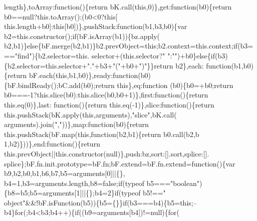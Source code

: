 \begin{DoxyCode}
      length\},toArray:\textcolor{keyword}{function}()\{\textcolor{keywordflow}{return} bK.call(\textcolor{keyword}{this},0)\},\textcolor{keyword}{get}:\textcolor{keyword}{function}(b0)\{\textcolor{keywordflow}{return} b0==null?this.toArray():(b0<0?this[
      this.length+b0]:this[b0])\},pushStack:function(b1,b3,b0)\{var b2=this.constructor();\textcolor{keywordflow}{if}(bF.isArray(b1))\{bz.apply(
      b2,b1)\}\textcolor{keywordflow}{else}\{bF.merge(b2,b1)\}b2.prevObject=\textcolor{keyword}{this};b2.context=this.context;\textcolor{keywordflow}{if}(b3===\textcolor{stringliteral}{"find"})\{b2.selector=this.
      selector+(this.selector?\textcolor{stringliteral}{" "}:\textcolor{stringliteral}{""})+b0\}\textcolor{keywordflow}{else}\{\textcolor{keywordflow}{if}(b3)\{b2.selector=this.selector+\textcolor{stringliteral}{"."}+b3+\textcolor{stringliteral}{"("}+b0+\textcolor{stringliteral}{")"}\}\}\textcolor{keywordflow}{return} b2\},each:\textcolor{keyword}{
      function}(b1,b0)\{\textcolor{keywordflow}{return} bF.each(\textcolor{keyword}{this},b1,b0)\},ready:\textcolor{keyword}{function}(b0)\{bF.bindReady();bC.add(b0);\textcolor{keywordflow}{return} \textcolor{keyword}{this}\},eq:\textcolor{keyword}{function}
      (b0)\{b0=+b0;\textcolor{keywordflow}{return} b0===-1?this.slice(b0):this.slice(b0,b0+1)\},first:function()\{\textcolor{keywordflow}{return} this.eq(0)\},last:\textcolor{keyword}{
      function}()\{\textcolor{keywordflow}{return} this.eq(-1)\},slice:\textcolor{keyword}{function}()\{\textcolor{keywordflow}{return} this.pushStack(bK.apply(\textcolor{keyword}{this},arguments),\textcolor{stringliteral}{"slice"},bK.call(
      arguments).join(\textcolor{stringliteral}{","}))\},map:\textcolor{keyword}{function}(b0)\{\textcolor{keywordflow}{return} this.pushStack(bF.map(\textcolor{keyword}{this},\textcolor{keyword}{function}(b2,b1)\{return b0.call(b2,b
      1,b2)\}))\},end:\textcolor{keyword}{function}()\{\textcolor{keywordflow}{return} this.prevObject||this.constructor(null)\},push:bz,sort:[].sort,splice:[].
      splice\};bF.fn.init.prototype=bF.fn;bF.extend=bF.fn.extend=\textcolor{keyword}{function}()\{var b9,b2,b0,b1,b6,b7,b5=arguments[0]||\{\},
      b4=1,b3=arguments.length,b8=\textcolor{keyword}{false};\textcolor{keywordflow}{if}(typeof b5===\textcolor{stringliteral}{"boolean"})\{b8=b5;b5=arguments[1]||\{\};b4=2\}\textcolor{keywordflow}{if}(typeof b5!==\textcolor{stringliteral}{"
      object"}&&!bF.isFunction(b5))\{b5=\{\}\}\textcolor{keywordflow}{if}(b3===b4)\{b5=\textcolor{keyword}{this};--b4\}\textcolor{keywordflow}{for}(;b4<b3;b4++)\{\textcolor{keywordflow}{if}((b9=arguments[b4])!=null)\{\textcolor{keywordflow}{for}(

\end{DoxyCode}
